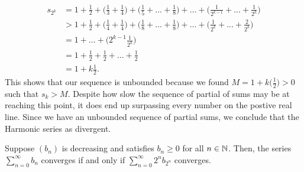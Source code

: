     \begin{align*}
        s_{2^k}&= 1 + \frac{1}{2} + \Big( \frac{1}{3} + \frac{1}{4} \Big) + \Big( \frac{1}{5} + ... + \frac{1}{8} \Big) + ... + \Big( \frac{1}{2^{k-1}} + ... + \frac{1}{2^k} \Big) \\
               &> 1 + \frac{1}{2} + \Big( \frac{1}{4} + \frac{1}{4}\Big) + \Big( \frac{1}{8} + ... + \frac{1}{8}\Big) + ... + \Big( \frac{1}{2^k} + ... + \frac{2}{2^k}\Big) \\
               &= 1 +... + \Big( 2^{k-1} \frac{1}{2^k}\Big) \\ 
               &= 1 + \frac{1}{2} + \frac{1}{2} + ... + \frac{1}{2} \\
               &= 1 + k\frac{1}{2}.
    \end{align*}
    This shows that our sequence is unbounded because we found \( M = 1 + k \Big( \frac{1}{2}\Big) > 0\) such that \( s_k > M \). Despite how slow the sequence of partial of sums may be at reaching this point, it does end up surpassing every number on the postive real line. Since we have an unbounded sequence of partial sums, we conclude that the Harmonic series as divergent.



\begin{theorem}
    Suppose \( (b_n)\) is decreasing and satisfies \( b_n \geq 0  \) for all \( n \in \mathbb{N} \). Then, the series \( \sum_{n=0}^{ \infty} b_n \)
    converges if and only if \( \sum_{n=0}^{ \infty} 2^n b_{2^n}\)
converges.
\end{theorem}

